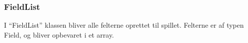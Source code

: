 \subsubsection{FieldList}
I “FieldList” klassen bliver alle felterne oprettet til spillet. Felterne er af typen Field, og bliver opbevaret i et array.

